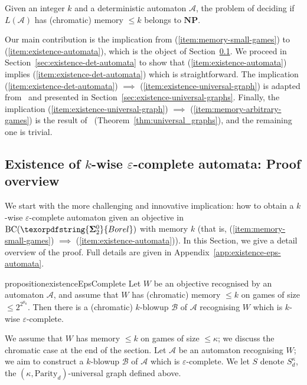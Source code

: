 \documentclass[a4paper,UKenglish,cleveref, thm-restate]{lipics-v2021}
\newcommand{\Parity}{\mathrm{Parity}}
\newcommand{\eps}{\varepsilon}
\newcommand{\boldclass}[3]{\texorpdfstring{\ensuremath{\mathbf{#1}^{#2}_{#3}}}{Borel}}
\newcommand{\bsigma}[1]{\boldclass{\Sigma}{0}{#1}}
\newcommand{\A}{\mathcal{A}}
\newcommand{\NP}{\textbf{NP}}
\newcommand{\B}{\mathcal B}
\newcommand{\BC}{\text{BC}}
\begin{document}
\begin{corollary}[Decidability in $\NP$]\label{thm:NP-computation-memory}
    Given an integer $k$ and a deterministic automaton $\A$, the problem of deciding if $L(\A)$ has (chromatic) memory $\leq k$ belongs to $\NP$.
\end{corollary}

Our main contribution is the implication from (\ref{item:memory-small-games}) to (\ref{item:existence-automata}), which is the object of Section~\ref{sec:existence_automata}.
We proceed in Section~\ref{sec:existence-det-automata} to show that (\ref{item:existence-automata}) implies (\ref{item:existence-det-automata}) which is straightforward.
The implication (\ref{item:existence-det-automata}) $\implies$ (\ref{item:existence-universal-graph}) is adapted from~\cite{CO24Positional} and presented in Section~\ref{sec:existence-universal-graphs}.
Finally, the implication (\ref{item:existence-universal-graph}) $\implies$ (\ref{item:memory-arbitrary-games}) is the result of~\cite{CO25LMCS} (Theorem~\ref{thm:universal_graphs}), and the remaining one is trivial.

\subsection{Existence of $k$-wise $\eps$-complete automata: Proof overview}\label{sec:existence_automata}

We start with the more challenging and innovative implication: how to obtain a $k$-wise $\eps$-complete automaton given an objective in $\BC(\bsigma 2)$ with memory $k$ (that is, (\ref{item:memory-small-games}) $\implies$ (\ref{item:existence-automata})).
In this Section, we give a detail overview of the proof. 
Full details are given in Appendix~\ref{app:existence-eps-automata}.

\begin{restatable}{proposition}{existenceEpsComplete}
    \label{prop:existenceEpsComplete}
    Let $W$ be an objective recognised by an automaton $\A$, and assume that $W$ has (chromatic) memory $\leq k$ on games of size $\leq 2^{2^{\aleph_0}}$.
    Then there is a (chromatic) $k$-blowup $\B$ of $\A$ recognising $W$ which is $k$-wise $\eps$-complete.
\end{restatable}

We assume that $W$ has memory $\leq k$ on games of size $\leq \kappa$; we discuss the chromatic case at the end of the section.
Let $\A$ be an automaton recognising $W$; we aim to construct a $k$-blowup $\B$ of $\A$ which is $\eps$-complete.
We let $S$ denote $S^\kappa_d$, the $(\kappa,\Parity_{d})$-universal graph defined above.
\end{document}
